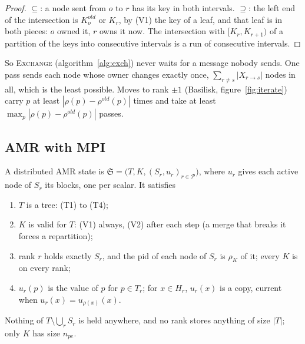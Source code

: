 \begin{proof}
  $\subseteq$: a node sent from $o$ to $r$ has its key in both intervals.
  $\supseteq$: the left end of the intersection is $K^{old}_o$ or $K_r$,
  by (V1) the key of a leaf, and that leaf is in both pieces: $o$ owned it,
  $r$ owns it now. The intersection with $[K_r, K_{r+1})$ of a partition
  of the keys into consecutive intervals is a run of consecutive intervals.
\end{proof}

So \textsc{Exchange} (algorithm~\ref{alg:exch}) never waits for a message
nobody sends. One pass sends each node whose owner changes exactly once,
$\sum_{r \ne s} |X_{r \to s}|$ nodes in all, which is the least possible.
Moves to rank $\pm 1$ (Basilisk, figure~\ref{fig:iterate}) carry $p$ at
least $|\rho(p) - \rho^{old}(p)|$ times and take at least $\max_p |\rho(p)
- \rho^{old}(p)|$ passes.

\subsection{AMR with MPI}
\label{sec:amr-mpi}

\begin{definition}
  \label{def:state}
  A distributed AMR state is $\mathfrak{S} = \big(T, K, (S_r, u_r)_{r \in
  \mathcal{P}}\big)$, where $u_r$ gives each active node of $S_r$ its
  blocks, one per scalar. It satisfies
  \begin{enumerate}[label=(I\arabic*)]
    \item $T$ is a tree: (T1) to (T4);
    \item $K$ is valid for $T$: (V1) always, (V2) after each step (a merge
      that breaks it forces a repartition);
    \item rank $r$ holds exactly $S_r$, and the pid of each node of $S_r$ is
      $\rho_K$ of it; every $K$ is on every rank;
    \item $u_r(p)$ is the value of $p$ for $p \in T_r$; for $x \in H_r$,
      $u_r(x)$ is a copy, current when $u_r(x) = u_{\rho(x)}(x)$.
  \end{enumerate}
  Nothing of $T \setminus \bigcup_r S_r$ is held anywhere, and no rank
  stores anything of size $|T|$; only $K$ has size $n_{pe}$.
\end{definition}

